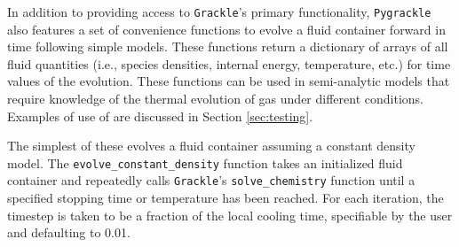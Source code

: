 In addition to providing access to \texttt{Grackle}'s primary
functionality, \texttt{Pygrackle} also features a set of convenience functions
to evolve a fluid container forward in time following simple models.
These functions return a dictionary of arrays of all fluid quantities
(i.e., species densities, internal energy, temperature, etc.) for time
values of the evolution.  These functions can be used in semi-analytic
models that require knowledge of the thermal evolution of gas under
different conditions.  Examples of use of are discussed in
Section \ref{sec:testing}.

The simplest of these evolves a fluid container assuming a constant
density model.  The \texttt{evolve\_constant\_density} function takes
an initialized fluid container and repeatedly calls \texttt{Grackle}'s
\texttt{solve\_chemistry} function until a specified stopping time or
temperature has been reached.  For each iteration, the timestep is
taken to be a fraction of the local cooling time, specifiable by the
user and defaulting to 0.01.

